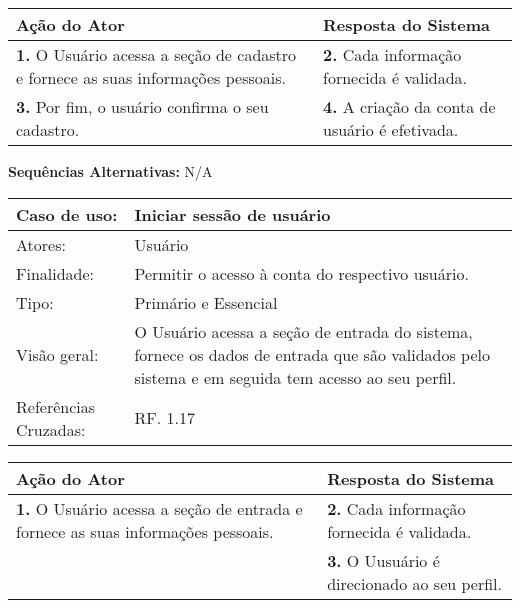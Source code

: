 \documentclass[12pt,a4paper,onecolumn,titlepage]{article}
\begin{document}
\begin{center}
\def\arraystretch{1.1}
\begin{tabular}{|p{6cm}|p{6cm}|}

\hline
\textbf{Ação do Ator} & \textbf{Resposta do Sistema} \\ \hline
\textbf{1.} O Usuário acessa a seção de cadastro e fornece as suas informações pessoais. & \textbf{2.} Cada informação fornecida é validada. \\ \hline
\textbf{3.} Por fim, o usuário confirma o seu cadastro. & \textbf{4.} A criação da conta de usuário é efetivada. \\ \hline
\end{tabular}
\end{center}

\textbf{Sequências Alternativas:} N/A

\newpage

\begin{table}[h!]
\begin{center}
\begin{tabular}{p{2.5cm} p{9.5cm}}
Caso de uso: & \textbf{Iniciar sessão de usuário} \\ \hline
Atores: & Usuário \\ \hline
Finalidade: & Permitir o acesso à conta do respectivo usuário. \\ \hline
Tipo: & Primário e Essencial \\ \hline
Visão geral: & O Usuário acessa a seção de entrada do sistema, fornece os dados de entrada que são validados pelo sistema e em seguida tem acesso ao seu perfil. \\ \hline
Referências Cruzadas: & RF. 1.17

\end{tabular}
\end{center}
\end{table}

\begin{center}
\def\arraystretch{1.1}
\begin{tabular}{|p{6cm}|p{6cm}|}

\hline
\textbf{Ação do Ator} & \textbf{Resposta do Sistema} \\ \hline
\textbf{1.} O Usuário acessa a seção de entrada e fornece as suas informações pessoais. & \textbf{2.} Cada informação fornecida é validada. \\ \hline
 & \textbf{3.} O Uusuário é direcionado ao seu perfil. \\ \hline
\end{tabular}
\end{center}
\end{document}

